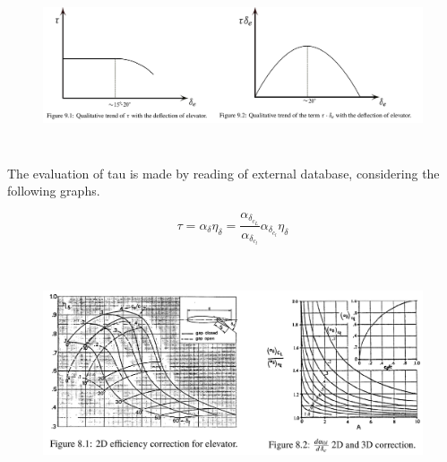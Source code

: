 \begin{figure}[H]
\centering
{\includegraphics[height=4.9cm]{Immagini/tau.png}} 
\label{tau3}
\end{figure} 		


		
The evaluation of tau is made by reading of external database, considering the following graphs.
	
\begin{equation}
\tau = \alpha_{\delta} \eta_{\delta} = \frac{\alpha_{{\delta}_{c_L}}}{\alpha_{{\delta}_{c_l}}}\alpha_{{\delta}_{c_l}} \eta_{\delta}
\end{equation}



%
%

\begin{figure}[H]
\centering
{\includegraphics[height=6.79cm]{Immagini/alfadeltanew.png}} 
\label{efficiency}
\end{figure} 		


